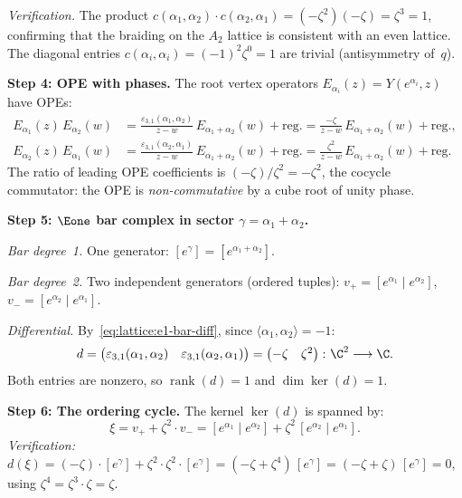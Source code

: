 \begin{computation}[\texorpdfstring{$A_2$}{A_2} at the Coxeter root: \texorpdfstring{$N = 3$}{N = 3}, \texorpdfstring{$q = 1$}{q = 1}]
\noindent\emph{Verification.} The product
$c(\alpha_1,\alpha_2) \cdot c(\alpha_2,\alpha_1)
= (-\zeta^2)(-\zeta) = \zeta^3 = 1$, confirming that the braiding
on the $A_2$ lattice is consistent with an even lattice.
The diagonal entries
$c(\alpha_i,\alpha_i) = (-1)^{2}\zeta^{0} = 1$
are trivial (antisymmetry of~$q$).
\smallskip

\noindent\textbf{Step 4: OPE with phases.}
The root vertex operators
$E_{\alpha_i}(z) = Y(e^{\alpha_i}, z)$ have OPEs:
\begin{align*}
E_{\alpha_1}(z)\, E_{\alpha_2}(w)
&= \frac{\varepsilon_{3,1}(\alpha_1,\alpha_2)}{z - w}
 \,E_{\alpha_1+\alpha_2}(w) + \mathrm{reg.}
= \frac{-\zeta}{z - w}\,E_{\alpha_1+\alpha_2}(w) + \mathrm{reg.}, \\
E_{\alpha_2}(z)\, E_{\alpha_1}(w)
&= \frac{\varepsilon_{3,1}(\alpha_2,\alpha_1)}{z - w}
 \,E_{\alpha_1+\alpha_2}(w) + \mathrm{reg.}
= \frac{\zeta^2}{z - w}\,E_{\alpha_1+\alpha_2}(w) + \mathrm{reg.}
\end{align*}
The ratio of leading OPE coefficients is
$(-\zeta)/\zeta^2 = -\zeta^2$, the cocycle commutator: the OPE is
\emph{non-commutative} by a cube root of unity phase.
\smallskip

\noindent\textbf{Step 5: $\Eone$ bar complex in sector
$\gamma = \alpha_1 + \alpha_2$.}

\emph{Bar degree~1.}
One generator: $[e^{\gamma}] = [e^{\alpha_1+\alpha_2}]$.

\emph{Bar degree~2.}
Two independent generators (ordered tuples):
$v_+ = [e^{\alpha_1} \mid e^{\alpha_2}]$,\;
$v_- = [e^{\alpha_2} \mid e^{\alpha_1}]$.

\emph{Differential.}
By~\eqref{eq:lattice:e1-bar-diff}, since
$\langle\alpha_1,\alpha_2\rangle = -1$:
\[
d =
\begin{pmatrix}
\varepsilon_{3,1}(\alpha_1,\alpha_2) &
\varepsilon_{3,1}(\alpha_2,\alpha_1)
\end{pmatrix}
=
\begin{pmatrix} -\zeta & \zeta^2 \end{pmatrix}
\colon \C^2 \longrightarrow \C.
\]
Both entries are nonzero, so $\operatorname{rank}(d) = 1$
and $\dim\ker(d) = 1$.
\smallskip

\noindent\textbf{Step 6: The ordering cycle.}
The kernel $\ker(d)$ is spanned by:
\begin{equation}\label{eq:lattice:a2-n3-cycle}
\xi = v_+ + \zeta^2 \cdot v_-
= [e^{\alpha_1} \mid e^{\alpha_2}]
 + \zeta^2\,[e^{\alpha_2} \mid e^{\alpha_1}].
\end{equation}
\emph{Verification:}
$d(\xi) = (-\zeta) \cdot [e^\gamma]
 + \zeta^2 \cdot \zeta^2 \cdot [e^\gamma]
= (-\zeta + \zeta^4)\,[e^\gamma]
= (-\zeta + \zeta)\,[e^\gamma]
= 0$,
using $\zeta^4 = \zeta^3 \cdot \zeta = \zeta$.


\end{computation}
